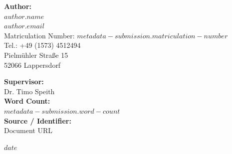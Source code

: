 \begin{titlepage}
  \begin{minipage}{0.45\textwidth}
    \begin{flushleft}
      \textbf{Author:}\\
      $author.name$\\
      $author.email$\\
      Matriculation Number: $metadata-submission.matriculation-number$\\
      Tel.: +49 (1573) 4512494\\
      Pielmühler Straße 15\\
      52066 Lappersdorf
    \end{flushleft}
  \end{minipage}
  \hfill
  \begin{minipage}{0.45\textwidth}
    \begin{flushright}
      \textbf{Supervisor:}\\
      Dr. Timo Speith\\[1cm]
      \textbf{Word Count:}\\
      $metadata-submission.word-count$\\[1cm]
      \textbf{Source / Identifier:}\\
      Document URL
    \end{flushright}
  \end{minipage}
  
  \vfill
  \begin{center}
    $date$
  \end{center}
\end{titlepage}